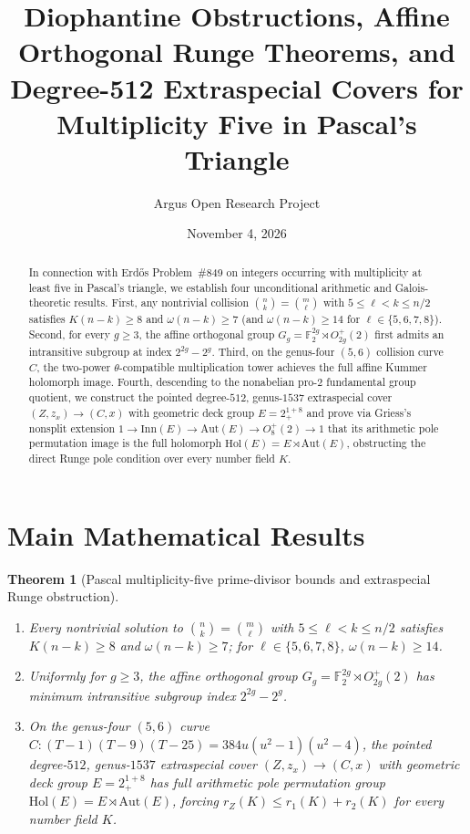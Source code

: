 \documentclass[10pt,reqno]{amsart}
\title[Diophantine and Extraspecial Runge Theorems for Pascal's Triangle]
{Diophantine Obstructions, Affine Orthogonal Runge Theorems, and Degree-512 Extraspecial Covers for Multiplicity Five in Pascal's Triangle}
\author{Argus Open Research Project}
\date{November 4, 2026}
\newtheorem{theorem}{Theorem}[section]
\theoremstyle{definition}
\begin{document}
\begin{abstract}
In connection with Erd\H{o}s Problem~\#849 on integers occurring with multiplicity at least five in Pascal's triangle, we establish four unconditional arithmetic and Galois-theoretic results. First, any nontrivial collision $\binom{n}{k} = \binom{m}{\ell}$ with $5 \le \ell < k \le n/2$ satisfies $K(n-k) \ge 8$ and $\omega(n-k) \ge 7$ (and $\omega(n-k) \ge 14$ for $\ell \in \{5,6,7,8\}$). Second, for every $g \ge 3$, the affine orthogonal group $G_g = \mathbb{F}_2^{2g} \rtimes O^+_{2g}(2)$ first admits an intransitive subgroup at index $2^{2g}-2^g$. Third, on the genus-four $(5,6)$ collision curve $C$, the two-power $\theta$-compatible multiplication tower achieves the full affine Kummer holomorph image. Fourth, descending to the nonabelian pro-$2$ fundamental group quotient, we construct the pointed degree-$512$, genus-$1537$ extraspecial cover $(Z,z_x) \to (C,x)$ with geometric deck group $E = 2_+^{1+8}$ and prove via Griess's nonsplit extension $1 \to \mathrm{Inn}(E) \to \mathrm{Aut}(E) \to O_8^+(2) \to 1$ that its arithmetic pole permutation image is the full holomorph $\mathrm{Hol}(E) = E \rtimes \mathrm{Aut}(E)$, obstructing the direct Runge pole condition over every number field $K$.
\end{abstract}
\maketitle

\section{Main Mathematical Results}
\begin{theorem}[Pascal multiplicity-five prime-divisor bounds and extraspecial Runge obstruction]
\begin{enumerate}[label=\textup{(\arabic*)}]
  \item Every nontrivial solution to $\binom{n}{k} = \binom{m}{\ell}$ with $5 \le \ell < k \le n/2$ satisfies $K(n-k) \ge 8$ and $\omega(n-k) \ge 7$; for $\ell \in \{5,6,7,8\}$, $\omega(n-k) \ge 14$.
  \item Uniformly for $g \ge 3$, the affine orthogonal group $G_g = \mathbb{F}_2^{2g} \rtimes O^+_{2g}(2)$ has minimum intransitive subgroup index $2^{2g}-2^g$.
  \item On the genus-four $(5,6)$ curve $C \colon (T-1)(T-9)(T-25)=384u(u^2-1)(u^2-4)$, the pointed degree-$512$, genus-$1537$ extraspecial cover $(Z,z_x)\to(C,x)$ with geometric deck group $E=2_+^{1+8}$ has full arithmetic pole permutation group $\mathrm{Hol}(E) = E \rtimes \mathrm{Aut}(E)$, forcing $r_Z(K) \le r_1(K)+r_2(K)$ for every number field $K$.
\end{enumerate}
\end{theorem}
\end{document}
